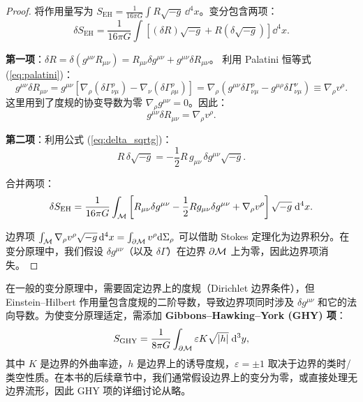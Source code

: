 \begin{proof}
将作用量写为 $S_{\text{EH}} = \frac{1}{16\pi G} \int R\sqrt{-g}\,\dd^4 x$。变分包含两项：
\begin{equation}
    \delta S_{\text{EH}} = \frac{1}{16\pi G} \int \left[ (\delta R)\sqrt{-g} + R(\delta\sqrt{-g}) \right] \dd^4 x.
\end{equation}

\textbf{第一项}：$\delta R = \delta(g^{\mu\nu}R_{\mu\nu}) = R_{\mu\nu}\delta g^{\mu\nu} + g^{\mu\nu}\delta R_{\mu\nu}$。
利用 Palatini 恒等式 (\ref{eq:palatini})：
\begin{equation}
    g^{\mu\nu}\delta R_{\mu\nu} = g^{\mu\nu}\left[\nabla_\rho(\delta\Gamma^\rho_{\nu\mu}) - \nabla_\nu(\delta\Gamma^\rho_{\rho\mu})\right]
    = \nabla_\rho\left(g^{\mu\nu}\delta\Gamma^\rho_{\nu\mu} - g^{\mu\rho}\delta\Gamma^\nu_{\nu\mu}\right) \equiv \nabla_\rho v^\rho.
\end{equation}
这里用到了度规的协变导数为零 $\nabla_\rho g^{\mu\nu} = 0$。因此：
\begin{equation}
    g^{\mu\nu}\delta R_{\mu\nu} = \nabla_\rho v^\rho.
\end{equation}

\textbf{第二项}：利用公式 (\ref{eq:delta_sqrtg})：
\begin{equation}
    R \, \delta\sqrt{-g} = -\frac{1}{2}R \, g_{\mu\nu} \, \delta g^{\mu\nu} \sqrt{-g}.
\end{equation}

合并两项：
\begin{equation}
    \delta S_{\text{EH}} = \frac{1}{16\pi G} \int_{\mathcal{M}} \left[ R_{\mu\nu}\delta g^{\mu\nu} - \frac{1}{2}R g_{\mu\nu}\delta g^{\mu\nu} + \nabla_\rho v^\rho \right] \sqrt{-g} \; \dd^4 x.
\end{equation}

边界项 $\int_{\mathcal{M}} \nabla_\rho v^\rho \sqrt{-g}\,\dd^4 x = \int_{\partial\mathcal{M}} v^\rho \dd\Sigma_\rho$ 可以借助 Stokes 定理化为边界积分。在变分原理中，我们假设 $\delta g^{\mu\nu}$（以及 $\delta\Gamma$）在边界 $\partial\mathcal{M}$ 上为零，因此边界项消失。
\end{proof}

\begin{note}
在一般的变分原理中，需要固定边界上的度规（Dirichlet 边界条件），但 Einstein--Hilbert 作用量包含度规的二阶导数，导致边界项同时涉及 $\delta g^{\mu\nu}$ 和它的法向导数。为使变分原理适定，需添加 \textbf{Gibbons--Hawking--York (GHY) 项}：
\begin{equation}
    S_{\text{GHY}} = \frac{1}{8\pi G} \int_{\partial\mathcal{M}} \varepsilon K \sqrt{|h|} \; \dd^3 y,
\end{equation}
其中 $K$ 是边界的外曲率迹，$h$ 是边界上的诱导度规，$\varepsilon = \pm 1$ 取决于边界的类时/类空性质。在本书的后续章节中，我们通常假设边界上的变分为零，或直接处理无边界流形，因此 GHY 项的详细讨论从略。
\end{note}

